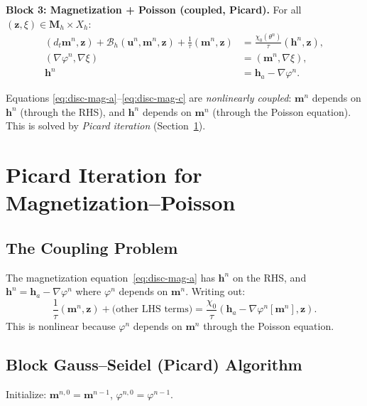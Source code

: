 \documentclass[11pt,a4paper]{article}
\theoremstyle{definition}
\theoremstyle{remark}
\newcommand{\grad}{\nabla}
\newcommand{\bfu}{\bm{u}}
\newcommand{\bfm}{\bm{m}}
\newcommand{\bfh}{\bm{h}}
\newcommand{\bfz}{\bm{z}}
\newcommand{\bfM}{\bm{M}}
\begin{document}
\bigskip
\noindent\textbf{Block 3: Magnetization + Poisson (coupled, Picard).}
For all $(\bfz, \xi) \in \bfM_h \times X_h$:
\begin{subequations}
\label{eq:disc-mag}
\begin{align}
  (d_t\bfm^n, \bfz)
  + \mathcal{B}_h(\bfu^n, \bfm^n, \bfz)
  + \frac{1}{\tau}(\bfm^n, \bfz)
  &= \frac{\chi_0(\theta^n)}{\tau}(\bfh^n, \bfz),
  \label{eq:disc-mag-a} \\
  (\grad\varphi^n, \grad\xi) &= (\bfm^n, \grad\xi),
  \label{eq:disc-mag-b} \\
  \bfh^n &= \bfh_a - \grad\varphi^n.
  \label{eq:disc-mag-c}
\end{align}
\end{subequations}

\begin{keypoint}
Equations \eqref{eq:disc-mag-a}--\eqref{eq:disc-mag-c} are
\emph{nonlinearly coupled}: $\bfm^n$ depends on $\bfh^n$ (through the
RHS), and $\bfh^n$ depends on $\bfm^n$ (through the Poisson equation).
This is solved by \emph{Picard iteration} (Section~\ref{sec:picard}).
\end{keypoint}


\section{Picard Iteration for Magnetization--Poisson}
\label{sec:picard}

\subsection{The Coupling Problem}

The magnetization equation~\eqref{eq:disc-mag-a} has $\bfh^n$ on the
RHS, and $\bfh^n = \bfh_a - \grad\varphi^n$ where $\varphi^n$ depends
on $\bfm^n$. Writing out:
\[
  \frac{1}{\tau}(\bfm^n, \bfz)
  + \text{(other LHS terms)}
  = \frac{\chi_0}{\tau}(\bfh_a - \grad\varphi^n[\bfm^n], \bfz).
\]
This is nonlinear because $\varphi^n$ depends on $\bfm^n$ through the
Poisson equation.

\subsection{Block Gauss--Seidel (Picard) Algorithm}

Initialize: $\bfm^{n,0} = \bfm^{n-1}$, $\varphi^{n,0} = \varphi^{n-1}$.
\end{document}

